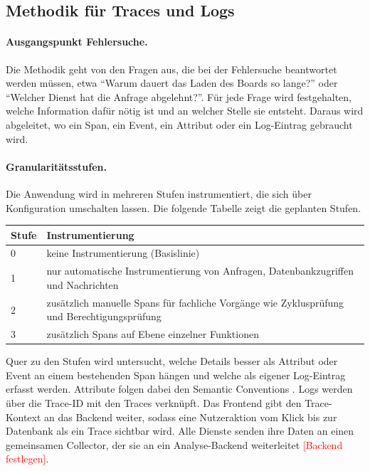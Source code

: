\documentclass[11pt, a4paper]{article}
\newcommand{\offen}[1]{\textcolor{red}{[#1]}}
\begin{document}
\subsection{Methodik für Traces und Logs}

\paragraph{Ausgangspunkt Fehlersuche.} Die Methodik geht von den Fragen aus, die bei der Fehlersuche beantwortet werden müssen, etwa \enquote{Warum dauert das Laden des Boards so lange?} oder \enquote{Welcher Dienst hat die Anfrage abgelehnt?}. Für jede Frage wird festgehalten, welche Information dafür nötig ist und an welcher Stelle sie entsteht. Daraus wird abgeleitet, wo ein Span, ein Event, ein Attribut oder ein Log-Eintrag gebraucht wird.

\paragraph{Granularitätsstufen.} Die Anwendung wird in mehreren Stufen instrumentiert, die sich über Konfiguration umschalten lassen. Die folgende Tabelle zeigt die geplanten Stufen.

\begin{center}
\small
\begin{tabularx}{\textwidth}{@{}l X@{}}
\toprule
\textbf{Stufe} & \textbf{Instrumentierung} \\
\midrule
0 & keine Instrumentierung (Basislinie) \\
1 & nur automatische Instrumentierung von Anfragen, Datenbankzugriffen und Nachrichten \\
2 & zusätzlich manuelle Spans für fachliche Vorgänge wie Zyklusprüfung und Berechtigungsprüfung \\
3 & zusätzlich Spans auf Ebene einzelner Funktionen \\
\bottomrule
\end{tabularx}
\end{center}

Quer zu den Stufen wird untersucht, welche Details besser als Attribut oder Event an einem bestehenden Span hängen und welche als eigener Log-Eintrag erfasst werden. Attribute folgen dabei den Semantic Conventions \cite{otel_semconv}. Logs werden über die Trace-ID mit den Traces verknüpft. Das Frontend gibt den Trace-Kontext an das Backend weiter, sodass eine Nutzeraktion vom Klick bis zur Datenbank als ein Trace sichtbar wird. Alle Dienste senden ihre Daten an einen gemeinsamen Collector, der sie an ein Analyse-Backend weiterleitet \offen{Backend festlegen}.
\end{document}
